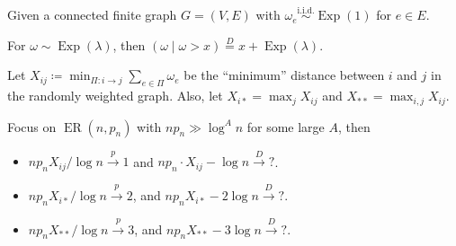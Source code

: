 Given a connected finite graph \(G = (V, E)\) with \(\omega _e \overset{\text{i.i.d.} }{\sim } \operatorname{Exp}(1) \) for \(e \in E\).

\begin{prev}
	For \(\omega \sim \operatorname{Exp}(\lambda ) \), then \((\omega \mid \omega > x) \overset{D}{=} x + \operatorname{Exp}(\lambda ) \).
\end{prev}

Let \(X_{ij} \coloneqq \min _{\Pi \colon i \to j} \sum_{e \in \Pi } \omega _e\) be the ``minimum'' distance between \(i\) and \(j\) in the randomly weighted graph. Also, let \(X_{i \ast} = \max _j X_{ij}\) and \(X_{\ast\ast} = \max _{i, j} X_{ij}\).

\begin{theorem}
	Focus on \(\operatorname{ER}(n, p_n) \) with \(n p_n \gg \log ^A n\) for some large \(A\), then
	\begin{itemize}
		\item \(np_n X_{ij} / \log n \overset{p}{\to} 1\) and \(n p_n \cdot X_{ij} - \log n \overset{D}{\to} ?\).
		\item \(n p_n X_{i \ast} / \log n \overset{p}{\to} 2\), and \(n p_n X_{i \ast} - 2 \log n \overset{D}{\to} ?\).
		\item \(n p_n X_{\ast\ast} / \log n \overset{p}{\to} 3\), and \(n p_n X_{\ast\ast} - 3 \log n \overset{D}{\to} ?\).
	\end{itemize}
\end{theorem}
